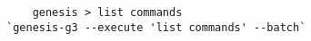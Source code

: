 \begin{verbatim}
    genesis > list commands 
`genesis-g3 --execute 'list commands' --batch`
\end{verbatim}
